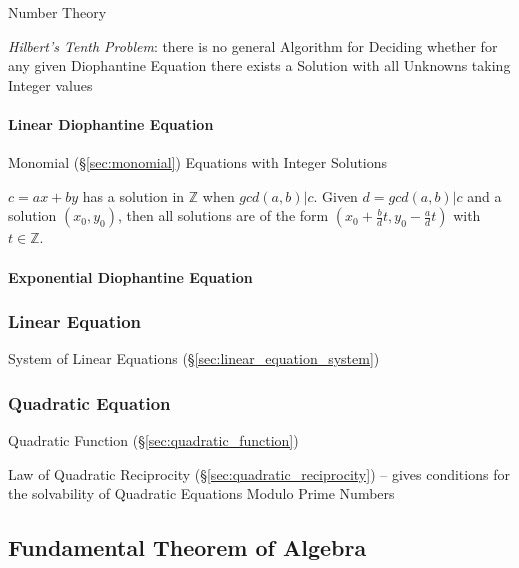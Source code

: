 \fist Number Theory

\emph{Hilbert's Tenth Problem}: there is no general Algorithm for Deciding
whether for any given Diophantine Equation there exists a Solution with all
Unknowns taking Integer values



\paragraph{Linear Diophantine Equation}
\label{sec:linear_diophantine}\hfill

Monomial (\S\ref{sec:monomial}) Equations with Integer Solutions

$c = ax + by$ has a solution in $\mathbb{Z}$ when $gcd(a,b)|c$. Given
$d=gcd(a,b)|c$ and a solution $(x_0, y_0)$, then all solutions are of
the form $(x_0 + \frac{b}{d}t, y_0 - \frac{a}{d}t)$ with $t \in
\mathbb{Z}$.



\paragraph{Exponential Diophantine Equation}\hfill
\label{sec:exponential_diophantine}



\subsubsection{Linear Equation}\label{sec:linear_equation}

System of Linear Equations (\S\ref{sec:linear_equation_system})



\subsubsection{Quadratic Equation}\label{sec:quadratic_equation}

Quadratic Function (\S\ref{sec:quadratic_function})

\fist Law of Quadratic Reciprocity (\S\ref{sec:quadratic_reciprocity}) -- gives
conditions for the solvability of Quadratic Equations Modulo Prime Numbers



\subsection{Fundamental Theorem of Algebra}
\label{sec:fundamental_algebra_theorem}

